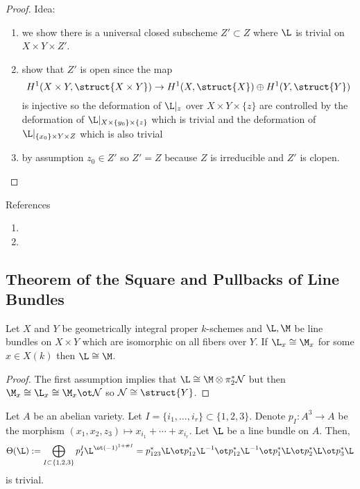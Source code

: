 \documentclass[12pt]{article}
\begin{document}
\begin{proof}
Idea: 
\begin{enumerate}
\item we show there is a universal closed subscheme $Z' \subset Z$ where $\L$ is trivial on $X \times Y \times Z'$.
\item show that $Z'$ is open since the map
\[ H^1(X \times Y, \struct{X \times Y}) \to H^1(X, \struct{X}) \oplus H^1(Y, \struct{Y}) \]
is injective so the deformation of $\L|_z$ over $X \times Y \times \{ z \}$ are controlled by the deformation of $\L |_{X \times \{ y_0 \} \times \{ z \}}$ which is trivial and the deformation of $\L |_{ \{ x_0 \} \times Y \times Z}$ which is also trivial
\item by assumption $z_0 \in Z'$ so $Z' = Z$ because $Z$ is irreducible and $Z'$ is clopen.
\end{enumerate}
\end{proof}

References
\begin{enumerate}
\item {}

\item {}
\end{enumerate}

\subsection{Theorem of the Square and Pullbacks of Line Bundles}

\begin{theorem}
Let $X$ and $Y$ be geometrically integral proper $k$-schemes and $\L, \M$ be line bundles on $X \times Y$ which are isomorphic on all fibers over $Y$. If $\L_x \cong \M_x$ for some $x \in X(k)$ then $\L \cong \M$.
\end{theorem}

\begin{proof}
The first assumption implies that $\L \cong \M \otimes \pi_2^* \cN$ but then $\M_x \cong \L_x \cong \M_x \ot \cN$ so $\cN \cong \struct{Y}$. 
\end{proof}

\begin{prop}
Let $A$ be an abelian variety. Let $I = \{ i_1, \dots, i_r \} \subset \{1, 2, 3 \}$. Denote $p_I : A^3 \to A$ be the morphism $(x_1, x_2, z_3) \mapsto x_{i_1} + \cdots + x_{i_r}$. Let $\L$ be a line bundle on $A$. Then,
\[ \Theta(\L) := \bigoplus_{I \subset \{1, 2, 3 \}} p^I_I \L^{\ot (-1)^{1 + \# I}} = p_{123}^* \L \ot p_{12}^* \L^{-1} \ot p_{12}^* \L^{-1} \ot p_1^* \L \ot p_2^* \L \ot p_3^* \L \]
is trivial.
\end{prop}
\end{document}

